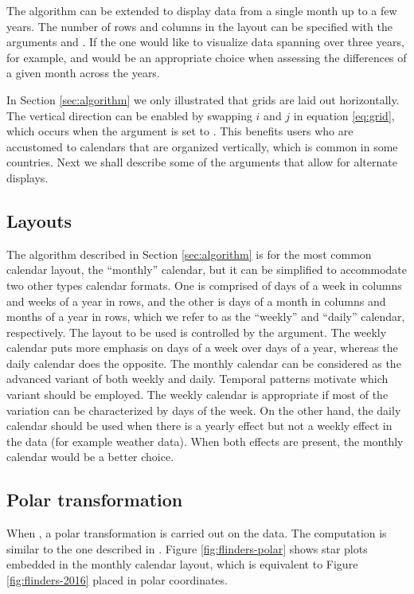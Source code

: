 \documentclass[article]{jss}
\theoremstyle{definition}
\theoremstyle{definition}
\theoremstyle{remark}
\begin{document}
The algorithm can be extended to display data from a single month up to
a few years. The number of rows and columns in the layout can be
specified with the arguments  and . If the one
would like to visualize data spanning over three years, for example,
 and  would be an appropriate choice when
assessing the differences of a given month across the years.

In Section \ref{sec:algorithm} we only illustrated that grids are laid
out horizontally. The vertical direction can be enabled by swapping
\(i\) and \(j\) in equation \eqref{eq:grid}, which occurs when the
argument  is set to . This benefits users who are
accustomed to calendars that are organized vertically, which is common
in some countries. Next we shall describe some of the arguments that
allow for alternate displays.

\subsection{Layouts}\label{layouts}

The algorithm described in Section \ref{sec:algorithm} is for the most
common calendar layout, the ``monthly'' calendar, but it can be
simplified to accommodate two other types calendar formats. One is
comprised of days of a week in columns and weeks of a year in rows, and
the other is days of a month in columns and months of a year in rows,
which we refer to as the ``weekly'' and ``daily'' calendar,
respectively. The layout to be used is controlled by the 
argument. The weekly calendar puts more emphasis on days of a week over
days of a year, whereas the daily calendar does the opposite. The
monthly calendar can be considered as the advanced variant of both
weekly and daily. Temporal patterns motivate which variant should be
employed. The weekly calendar is appropriate if most of the variation
can be characterized by days of the week. On the other hand, the daily
calendar should be used when there is a yearly effect but not a weekly
effect in the data (for example weather data). When both effects are
present, the monthly calendar would be a better choice.

\subsection{Polar transformation}\label{polar-transformation}

When , a polar transformation is carried out on the
data. The computation is similar to the one described in
\citet{Wickham2012glyph}. Figure \ref{fig:flinders-polar} shows star
plots embedded in the monthly calendar layout, which is equivalent to
Figure \ref{fig:flinders-2016} placed in polar coordinates.
\end{document}
